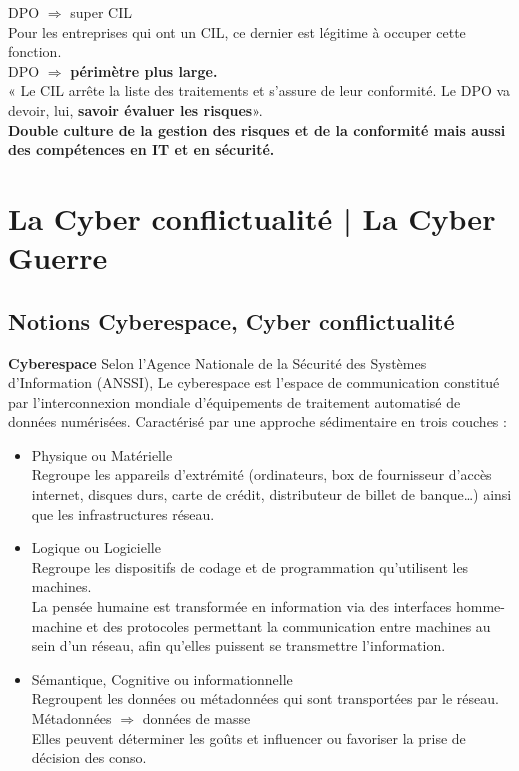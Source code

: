 \documentclass[a4paper,11pt]{report}
\begin{document}
DPO $\Rightarrow$ super CIL\\
Pour les entreprises qui ont un CIL, ce dernier est légitime à occuper cette fonction.\\
DPO $\Rightarrow$ \textbf{périmètre plus large.}\\
« Le CIL arrête la liste des traitements et s’assure de leur conformité. Le DPO va devoir, lui, \textbf{savoir évaluer les risques}».\\

\textbf{Double culture de la gestion des risques et de la conformité mais aussi des compétences en IT et en sécurité.}

\chapter{La Cyber conflictualité | La Cyber Guerre}
\section{Notions Cyberespace, Cyber conflictualité}
\textbf{Cyberespace} 
Selon l’Agence Nationale de la Sécurité des Systèmes d’Information (ANSSI),
Le cyberespace est l’espace de communication constitué par l’interconnexion mondiale d’équipements de traitement automatisé de données numérisées.
Caractérisé par une approche sédimentaire en trois couches :
\begin{itemize}
    \item Physique ou Matérielle \\ 
    Regroupe les appareils d’extrémité (ordinateurs, box de fournisseur d’accès internet, disques durs, carte de crédit, distributeur de billet de banque…) ainsi que les infrastructures réseau.
    \item Logique ou Logicielle \\
    Regroupe les dispositifs de codage et de programmation qu’utilisent les machines.\\
    La pensée humaine est transformée en information via des interfaces homme-machine et des protocoles permettant la communication entre machines au sein d’un réseau, afin qu’elles puissent se transmettre l’information.\\
    \item Sémantique, Cognitive ou informationnelle \\
    Regroupent les données ou métadonnées qui sont transportées par le réseau. \\
    Métadonnées $\Rightarrow$ données de masse\\
    Elles peuvent déterminer les goûts et influencer ou favoriser la prise de décision des conso.\\
\end{itemize}
\end{document}
